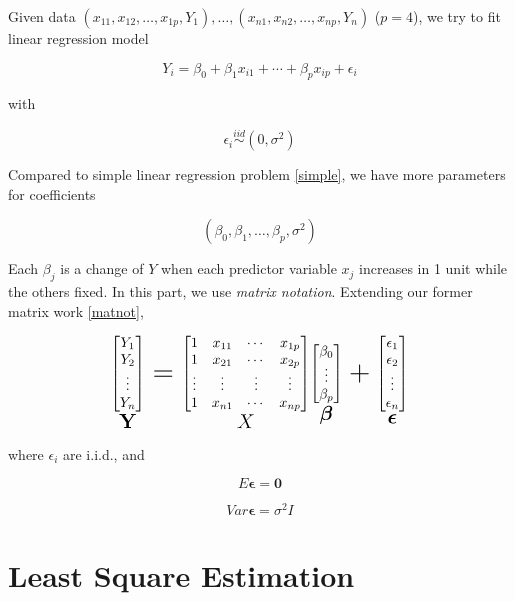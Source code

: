 \documentclass[]{book}
\newcommand{\E}{\boldsymbol\epsilon}
\theoremstyle{definition}
\theoremstyle{definition}
\theoremstyle{definition}
\theoremstyle{remark}
\begin{document}
Given data \((x_{11}, x_{12}, \ldots, x_{1p}, Y_1), \ldots, (x_{n1}, x_{n2}, \ldots, x_{np}, Y_n)\) (\(p = 4\)), we try to fit linear regression model

\[Y_i = \beta_0 + \beta_1 x_{i1} + \cdots + \beta_p x_{ip} + \epsilon_{i}\]

with

\[\epsilon_i \stackrel{iid}{\sim}(0, \sigma^2)\]

Compared to simple linear regression problem \ref{simple}, we have more parameters for coefficients

\[(\beta_0, \beta_1, \ldots, \beta_p, \sigma^2)\]

Each \(\beta_j\) is a change of \(Y\) when each predictor variable \(x_j\) increases in 1 unit while the others fixed. In this part, we use \emph{matrix notation}. Extending our former matrix work \ref{matnot},

\[
\underset{\huge \mathbf{Y}}{\begin{bmatrix}
  Y_1 \\
  Y_2 \\
  \vdots \\
  Y_n
\end{bmatrix}} = \underset{\huge X}{\begin{bmatrix}
  1 & x_{11} & \cdots & x_{1p} \\
  1 & x_{21} & \cdots & x_{2p} \\
  \vdots & \vdots & \vdots & \vdots \\
  1 & x_{n1} & \cdots & x_{np}
\end{bmatrix}} \underset{\huge \boldsymbol\beta}{\begin{bmatrix}
  \beta_0 \\
  \vdots \\
  \beta_p
\end{bmatrix}} + \underset{\huge \E}{\begin{bmatrix}
  \epsilon_1 \\
  \epsilon_2 \\
  \vdots \\
  \epsilon_n
\end{bmatrix}}
\]

where \(\epsilon_i\) are i.i.d., and

\[E \E = \mathbf{0}\]

\[Var \E = \sigma^2 I\]

\hypertarget{least-square-estimation}{%
\section{Least Square Estimation}\label{least-square-estimation}}
\end{document}
